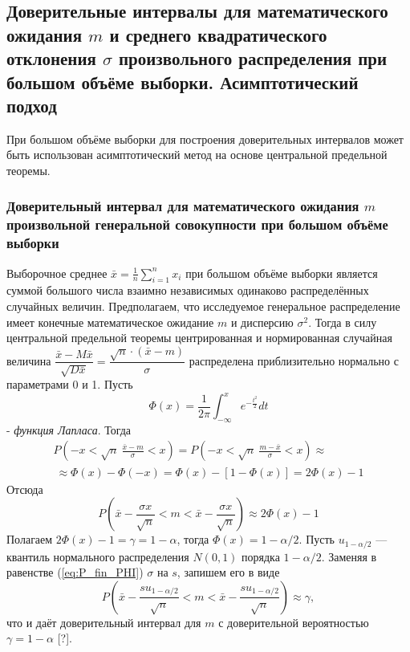 \subsection{Доверительные интервалы для математического ожидания $m$ и среднего квадратического отклонения $\sigma$ произвольного распределения при большом объёме выборки. Асимптотический подход}
При большом объёме выборки для построения доверительных интервалов может быть использован асимптотический метод на основе центральной предельной теоремы.

\subsubsection{Доверительный интервал для математического ожидания $m$ произвольной генеральной совокупности при большом объёме выборки}
Выборочное среднее $\bar{x} = \frac{1}{n}\sum_{i = 1}^{n}{x_{i}}$ при большом объёме выборки является суммой большого числа взаимно независимых одинаково распределённых случайных величин. Предполагаем, что исследуемое генеральное распределение имеет конечные математическое ожидание $m$ и дисперсию $\sigma^{2}$. Тогда в силу центральной предельной теоремы центрированная и нормированная случайная величина $\dfrac{\bar{x} - M\bar{x}}{\sqrt{D\bar{x}}} = \dfrac{\sqrt{n}·(\bar{x}-m)}{\sigma}$ распределена приблизительно нормально с параметрами 0 и 1. Пусть
\begin{equation}
	\Phi(x) = \frac{1}{2\pi}\int_{-\infty}^{x}{e^{-\frac{t^{2}}{2}}dt}
	\label{eq:f_lapl}
\end{equation}
- \textit{функция Лапласа}. Тогда
\begin{multline}
	P\left(-x < \sqrt{n} \ \frac{\bar{x} - m}{\sigma} < x \right) = 
	P\left(-x < \sqrt{n} \ \frac{m - \bar{x}}{\sigma} < x \right) \approx \\\
	\approx \Phi(x) - \Phi(-x)=\Phi(x) - [1 - \Phi(x)] = 2\Phi(x) - 1
	\label{eq:P_PHI}
\end{multline}
Отсюда
\begin{equation}
	P\left(\bar{x} - \frac{\sigma x}{\sqrt{n}} < m < \bar{x} - \frac{\sigma x}{\sqrt{n}} \right) \approx 2\Phi(x) - 1
	\label{eq:P_fin_PHI}
\end{equation}
Полагаем $2\Phi(x) - 1 = \gamma = 1 - \alpha$, тогда $\Phi(x) = 1 - \alpha/2$. Пусть $u_{1-\alpha/2}$ — квантиль нормального распределения $N(0,1)$ порядка $1-\alpha/2$. Заменяя в равенстве (\ref{eq:P_fin_PHI}) $\sigma$ на $s$, запишем его в виде
\begin{equation}
	P\left(\bar{x} - \frac{su_{1-\alpha/2}}{\sqrt{n}} < m < \bar{x} - \frac{su_{1-\alpha/2}}{\sqrt{n}} \right) \approx \gamma,
	\label{eq:P_fin_u}
\end{equation}
что и даёт доверительный интервал для $m$ с доверительной вероятностью $\gamma = 1-\alpha$ [?].

